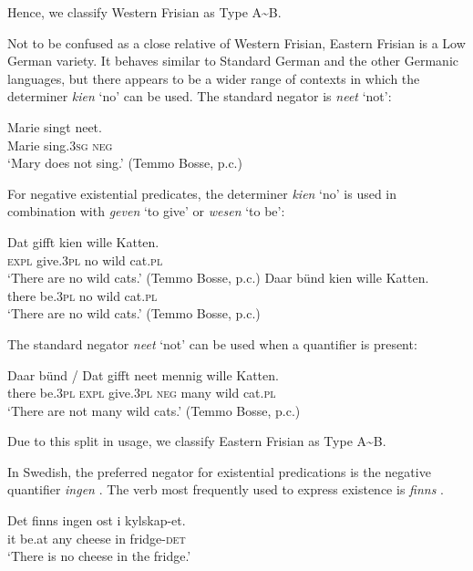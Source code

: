 \documentclass[output=paper,colorlinks,citecolor=brown]{langscibook}
\begin{document}
\begin{paperappendix}
\begin{unindented}
Hence, we classify Western Frisian as Type A{\textasciitilde}B.


Not to be confused as a close relative of Western Frisian, Eastern Frisian is a Low German variety. It behaves similar to Standard German and the other Germanic languages, but there appears to be a wider range of contexts in which the determiner \textit{kien} `no' can be used. The standard negator is \textit{neet} `not':
%
\begin{exe}\ex \gll Marie singt neet. \\
Marie sing.\textsc{3sg} \textsc{neg} \\
    \glt `Mary does not sing.' (Temmo Bosse, p.c.)
    \end{exe} 

For negative existential predicates, the determiner \textit{kien} `no' is used in combination with \textit{geven} `to give' or \textit{wesen} `to be':
%
\begin{exe}\ex \gll Dat gifft kien wille Katten. \\
\textsc{expl}  give.\textsc{3pl} no wild cat.\textsc{pl} \\
    \glt `There are no wild cats.' (Temmo Bosse, p.c.)
\ex \gll Daar bünd   kien wille Katten. \\
there be.\textsc{3pl} no   wild  cat.\textsc{pl} \\
    \glt `There are no wild cats.' (Temmo Bosse, p.c.)
    \end{exe}

The standard negator \textit{neet} `not' can be used when a quantifier is present:
%
\begin{exe}\ex \gll Daar bünd / Dat gifft neet mennig wille Katten. \\
there be.\textsc{3pl} {} \textsc{expl} give.\textsc{3pl} \textsc{neg} many     wild cat\textsc{.pl} \\
    \glt `There are not many wild cats.' (Temmo Bosse, p.c.)
    \end{exe}

Due to this split in usage, we classify Eastern Frisian as Type A{\textasciitilde}B. 


In Swedish, the preferred negator for existential predications is the negative quantifier \textit{ingen} \citep{Bordal2017}. The verb most frequently used to express existence is \textit{finns} \citep[9]{Bordal2017}. 
%
\begin{exe}\ex \gll Det finns ingen ost i   kylskap-et. \\
it be.at any cheese in fridge-\textsc{det} \\
    \glt `There is no cheese in the fridge.' \citep[115]{Veselinova2013}
    \end{exe}


\end{unindented}
\end{paperappendix}
\end{document}
